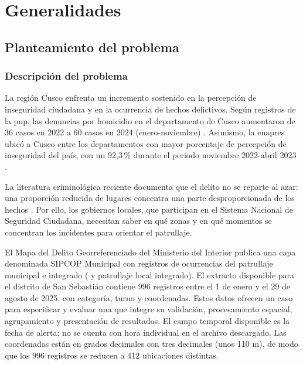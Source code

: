 \chapter{Generalidades}

\section{Planteamiento del problema}

\subsection{Descripción del problema}

La región Cusco enfrenta un incremento sostenido en la percepción de inseguridad ciudadana y en la ocurrencia de hechos delictivos. Según registros de la \gls{pnp}, las denuncias por homicidio en el departamento de Cusco aumentaron de 36 casos en 2022 a 60 casos en 2024 (enero-noviembre) \citep{pnp2024homicidios}. Asimismo, la \gls{enapres} ubicó a Cusco entre los departamentos con mayor porcentaje de percepción de inseguridad del país, con un 92,3\,\% durante el periodo noviembre 2022-abril 2023 \citep{inei2023enapres}.

La literatura criminológica reciente documenta que el delito no se reparte al azar: una proporción reducida de lugares concentra una parte desproporcionada de los hechos \citep{ristea2020crimegis,medinaariza2023hotspots}. Por ello, los gobiernos locales, que participan en el Sistema Nacional de Seguridad Ciudadana, necesitan saber en qué zonas y en qué momentos se concentran los incidentes para orientar el patrullaje.

El Mapa del Delito Georreferenciado del Ministerio del Interior publica una capa denominada SIPCOP Municipal con registros de ocurrencias del patrullaje municipal e integrado ( y patrullaje local integrado). El extracto disponible para el distrito de San Sebastián contiene 996 registros entre el 1 de enero y el 29 de agosto de 2025, con categoría, turno y coordenadas. Estos datos ofrecen un caso para especificar y evaluar una  que integre su validación, procesamiento espacial, agrupamiento y presentación de resultados. El campo temporal disponible es la fecha de alerta; no se cuenta con hora individual en el archivo descargado. Las coordenadas están en grados decimales con tres decimales (unos 110 m), de modo que los 996 registros se reducen a 412 ubicaciones distintas.

